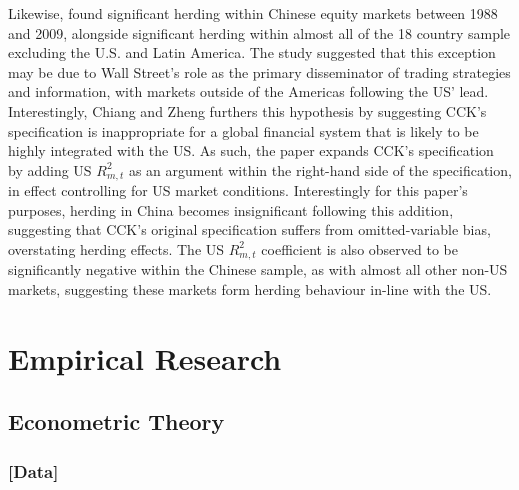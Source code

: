 \documentclass[12pt]{article}
\numberwithin{table}{section}   %
\begin{document}
Likewise, \citet{chiangzheng} found significant herding within Chinese equity markets between 1988 and 2009, alongside significant herding within almost all of the 18 country sample excluding the U.S. and Latin America. The study suggested that this exception may be due to Wall Street’s role as the primary disseminator of trading strategies and information, with markets outside of the Americas following the US’ lead. Interestingly, Chiang and Zheng furthers this hypothesis by suggesting CCK’s specification is inappropriate for a global financial system that is likely to be highly integrated with the US. As such, the paper expands CCK’s specification by adding US $R_{m,t}^2$ as an argument within the right-hand side of the specification, in effect controlling for US market conditions. Interestingly for this paper’s purposes, herding in China becomes insignificant following this addition, suggesting that CCK’s original specification suffers from omitted-variable bias, overstating herding effects. The US $R_{m,t}^2$ coefficient is also observed to be significantly negative within the Chinese sample, as with almost all other non-US markets, suggesting these markets form herding behaviour in-line with the US.

\break

\section{Empirical Research}

\subsection{Econometric Theory}

\subsubsection*{[Data]}
\end{document}
